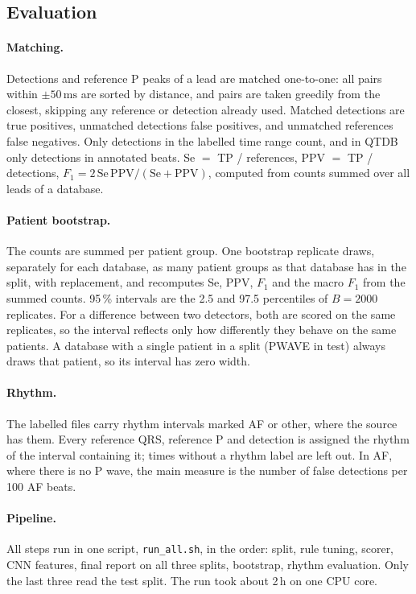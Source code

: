 \documentclass[11pt,a4paper]{article}
\newcommand{\code}[1]{\texttt{#1}}
\newcommand{\ms}{\,\mathrm{ms}}
\begin{document}
\subsection{Evaluation}

\paragraph{Matching.} Detections and reference P peaks of a lead are matched one-to-one: all pairs within $\pm50\ms$ are sorted by distance, and pairs are taken greedily from the closest, skipping any reference or detection already used. Matched detections are true positives, unmatched detections false positives, and unmatched references false negatives. Only detections in the labelled time range count, and in QTDB only detections in annotated beats. Se $=$ TP / references, PPV $=$ TP / detections, $F_1 = 2\,\text{Se}\,\text{PPV}/(\text{Se} + \text{PPV})$, computed from counts summed over all leads of a database.

\paragraph{Patient bootstrap.} The counts are summed per patient group. One bootstrap replicate draws, separately for each database, as many patient groups as that database has in the split, with replacement, and recomputes Se, PPV, $F_1$ and the macro $F_1$ from the summed counts. 95\,\% intervals are the 2.5 and 97.5 percentiles of $B = 2000$ replicates. For a difference between two detectors, both are scored on the same replicates, so the interval reflects only how differently they behave on the same patients. A database with a single patient in a split (PWAVE in test) always draws that patient, so its interval has zero width.

\paragraph{Rhythm.} The labelled files carry rhythm intervals marked AF or other, where the source has them. Every reference QRS, reference P and detection is assigned the rhythm of the interval containing it; times without a rhythm label are left out. In AF, where there is no P wave, the main measure is the number of false detections per 100 AF beats.

\paragraph{Pipeline.} All steps run in one script, \code{run\_all.sh}, in the order: split, rule tuning, scorer, CNN features, final report on all three splits, bootstrap, rhythm evaluation. Only the last three read the test split. The run took about 2\,h on one CPU core.
\end{document}
